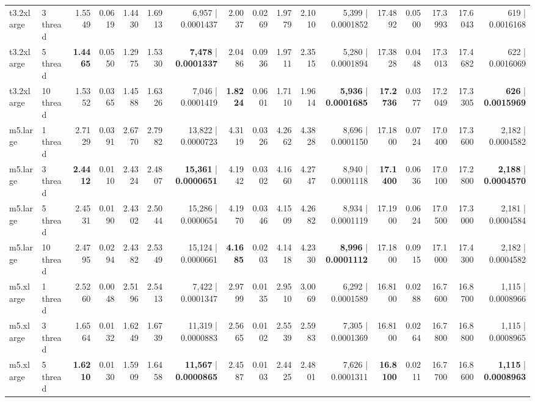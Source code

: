 \documentclass[conference]{IEEEtran}
\begin{document}
\begin{table}[h]
{\begin{tabular}{ll|rrrrr|rrrrr|rrrrr}
			t3.2xlarge & 3 thread & 1.5549 & 0.0619 & 1.4430 & 1.6913 & 6,957 | 0.0001437 & 2.0037 & 0.0269 & 1.9779 & 2.1010 & 5,399 | 0.0001852 & 17.4892 & 0.0500 & 17.3993 & 17.6043 & 619 | 0.0016168 \\
			t3.2xlarge & 5 thread & \textbf{1.4465} & 0.0550 & 1.2975 & 1.5330 & \textbf{7,478} | \textbf{0.0001337} & 2.0486 & 0.0936 & 1.9711 & 2.3515 & 5,280 | 0.0001894 & 17.3828 & 0.0448 & 17.3013 & 17.4682 & 622 | 0.0016069 \\
			t3.2xlarge & 10 thread & 1.5352 & 0.0365 & 1.4588 & 1.6326 & 7,046 | 0.0001419 & \textbf{1.8224} & 0.0601 & 1.7110 & 1.9614 & \textbf{5,936} | \textbf{0.0001685} & \textbf{17.2736} & 0.0377 & 17.2049 & 17.3305 & \textbf{626} | \textbf{0.0015969} \\
			\midrule
			m5.large & 1 thread & 2.7129 & 0.0391 & 2.6770 & 2.7982 & 13,822 | 0.0000723 & 4.3119 & 0.0326 & 4.2662 & 4.3828 & 8,696 | 0.0001150 & 17.1800 & 0.0724 & 17.0400 & 17.3600 & 2,182 | 0.0004582 \\
			m5.large & 3 thread & \textbf{2.4412} & 0.0110 & 2.4324 & 2.4807 & \textbf{15,361} | \textbf{0.0000651} & 4.1942 & 0.0302 & 4.1660 & 4.2747 & 8,940 | 0.0001118 & \textbf{17.1400} & 0.0636 & 17.0100 & 17.2800 & \textbf{2,188} | \textbf{0.0004570} \\
			m5.large & 5 thread & 2.4531 & 0.0190 & 2.4302 & 2.5044 & 15,286 | 0.0000654 & 4.1970 & 0.0346 & 4.1509 & 4.2682 & 8,934 | 0.0001119 & 17.1900 & 0.0624 & 17.0500 & 17.3000 & 2,181 | 0.0004584 \\
			m5.large & 10 thread & 2.4795 & 0.0294 & 2.4382 & 2.5349 & 15,124 | 0.0000661 & \textbf{4.1685} & 0.0203 & 4.1418 & 4.2330 & \textbf{8,996} | \textbf{0.0001112} & 17.1800 & 0.0915 & 17.1000 & 17.4300 & 2,182 | 0.0004582 \\
			\midrule
			m5.xlarge & 1 thread & 2.5260 & 0.0048 & 2.5196 & 2.5413 & 7,422 | 0.0001347 & 2.9799 & 0.0135 & 2.9510 & 3.0069 & 6,292 | 0.0001589 & 16.8100 & 0.0288 & 16.7600 & 16.8700 & 1,115 | 0.0008966 \\
			m5.xlarge & 3 thread & 1.6564 & 0.0132 & 1.6249 & 1.6739 & 11,319 | 0.0000883 & 2.5665 & 0.0102 & 2.5539 & 2.5983 & 7,305 | 0.0001369 & 16.8100 & 0.0264 & 16.7800 & 16.8800 & 1,115 | 0.0008965 \\
			m5.xlarge & 5 thread & \textbf{1.6210} & 0.0130 & 1.5909 & 1.6458 & \textbf{11,567} | \textbf{0.0000865} & 2.4587 & 0.0103 & 2.4425 & 2.4801 & 7,626 | 0.0001311 & \textbf{16.8100} & 0.0211 & 16.7700 & 16.8600 & \textbf{1,115} | \textbf{0.0008963} \\

\end{tabular}}
\end{table}
\end{document}
